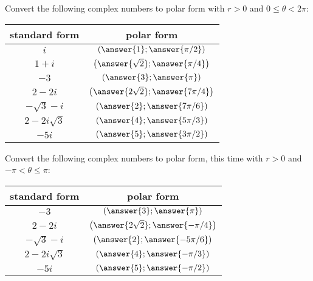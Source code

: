 \documentclass[space,nooutcomes]{ximera}
\begin{document}
\begin{problem}
Convert the following complex numbers to polar form with $r>0$ and $0\le\theta < 2\pi$:
\begin{center}
\begin{tabular}{c | c}
standard form & polar form \\
\hline
  $i$ & $\left( \answer{1}; \answer{\pi/2} \right)$ \\
 $1 + i$  & $\left( \answer{\sqrt{2}}; \answer{\pi/4} \right)$ \\
 $-3$ & $\left( \answer{3}; \answer{\pi} \right)$ \\
 $2 - 2i$ & $\left( \answer{2\sqrt{2}}; \answer{7\pi/4} \right)$ \\
 $-\sqrt{3}-i$ & $\left( \answer{2}; \answer{7\pi/6} \right)$ \\
 $2 - 2i\sqrt{3}$ & $\left( \answer{4}; \answer{5\pi/3} \right)$ \\
 $-5i$ & $\left( \answer{5}; \answer{3\pi/2} \right)$ \\
 \end{tabular}
\end{center}
\end{problem}

\begin{problem}
Convert the following complex numbers to polar form, this time with $r>0$ and $-\pi < \theta \le \pi$:
\begin{center}
\begin{tabular}{c | c}
standard form & polar form \\
\hline
 $-3$ & $\left( \answer{3}; \answer{\pi} \right)$ \\
 $2 - 2i$ & $\left( \answer{2\sqrt{2}}; \answer{-\pi/4} \right)$ \\
 $-\sqrt{3}-i$ & $\left( \answer{2}; \answer{-5\pi/6} \right)$ \\
 $2 - 2i\sqrt{3}$ & $\left( \answer{4}; \answer{-\pi/3} \right)$ \\
 $-5i$ & $\left( \answer{5}; \answer{-\pi/2} \right)$ \\
 \end{tabular}
\end{center}
\end{problem}
\end{document}
